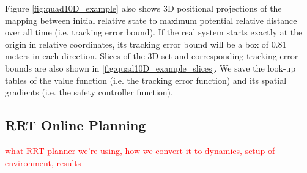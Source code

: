 Figure \ref{fig:quad10D_example} also shows 3D positional projections of the mapping between initial relative state to maximum potential relative distance over all time (i.e. tracking error bound). If the real system starts exactly at the origin in relative coordinates, its tracking error bound will be a box of 0.81 meters in each direction. Slices of the 3D set and corresponding tracking error bounds are also shown in \ref{fig:quad10D_example_slices}. We save the look-up tables of the value function (i.e. the tracking error function) and its spatial gradients (i.e. the safety controller function).

\subsection{RRT Online Planning}
\textcolor{red}{what RRT planner we're using, how we convert it to dynamics, setup of environment, results}

